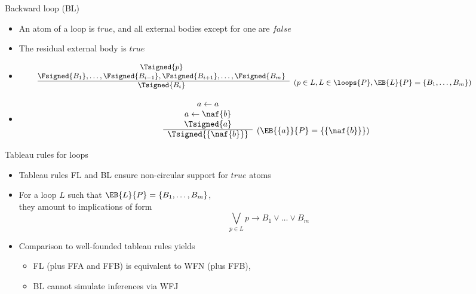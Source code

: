 \begin{frame}{Backward loop (BL)}

\begin{itemize}
\item {} An atom of a loop is $\mathit{true}$,
  and all external bodies except for one are $\mathit{false}$
\item {} The residual external body is $\mathit{true}$
\item {}
\[
\hspace{-10mm}
{\small
\begin{array}{@{}cl}
\Tsigned{p} \\
\Fsigned{B_1},\dots,\Fsigned{B_{i-1}},\Fsigned{B_{i+1}},\dots,\Fsigned{B_m} &
\raisebox{-8pt}[0pt][0pt]{($p \in L, L \in \loops{P}, \EB{L}{P}=\{B_1,\dots,B_m\}$)}
\\\cline{1-1}
\Tsigned{B_i}
\end{array}
}
\]
\item<2-> 
\[
\begin{array}{cl}
a \leftarrow a \\
a \leftarrow \naf{b} \\
\Tsigned{a}&
\raisebox{-8pt}[0pt][0pt]{($\EB{\{a\}}{P}=\{\{\naf{b}\}\}$)}
\\\cline{1-1}
\Tsigned{\{\naf{b}\}}
\end{array}
\]
\end{itemize}
\end{frame}
\begin{frame}{Tableau rules for loops}
  \begin{itemize}
  \item<1-> Tableau rules FL and BL ensure non-circular support for $\mathit{true}$ atoms
  \item<2-> For a loop $L$ such that $\EB{L}{P}=\{B_1,\dots,B_m\}$,\\
    they amount to implications of form
    \[
    \textstyle\bigvee_{p\in L} p \rightarrow B_1 \vee\dots\vee B_m
    \]
  \item<3-> Comparison to well-founded tableau rules yields
    \begin{itemize}
    \item FL (plus FFA and FFB) is equivalent to WFN (plus FFB),
    \item BL cannot simulate inferences via WFJ
    \end{itemize}
  \end{itemize}
\end{frame}
